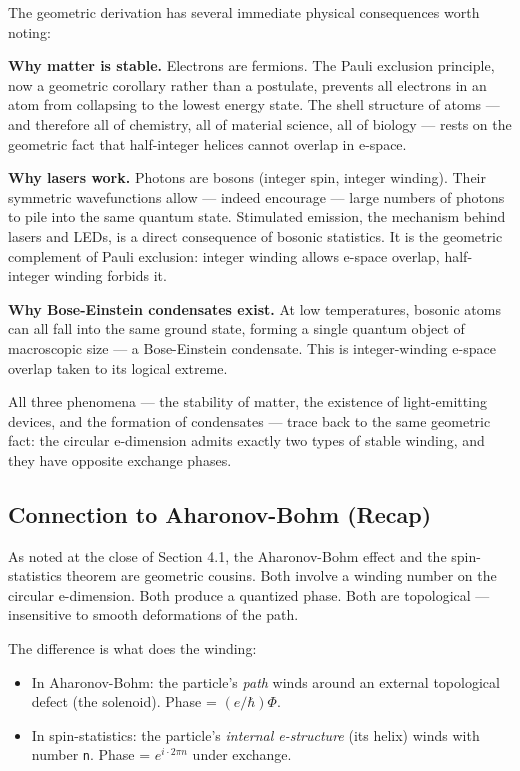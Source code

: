 \documentclass[aps,prd,preprint,superscriptaddress,longbibliography,floatfix]{revtex4-2}
\theoremstyle{remark}
\begin{document}
The geometric derivation has several immediate physical consequences worth noting:

\textbf{Why matter is stable.} Electrons are fermions. The Pauli exclusion principle, now a geometric corollary rather than a postulate, prevents all electrons in an atom from collapsing to the lowest energy state. The shell structure of atoms --- and therefore all of chemistry, all of material science, all of biology --- rests on the geometric fact that half-integer helices cannot overlap in e-space.

\textbf{Why lasers work.} Photons are bosons (integer spin, integer winding). Their symmetric wavefunctions allow --- indeed encourage --- large numbers of photons to pile into the same quantum state. Stimulated emission, the mechanism behind lasers and LEDs, is a direct consequence of bosonic statistics. It is the geometric complement of Pauli exclusion: integer winding allows e-space overlap, half-integer winding forbids it.

\textbf{Why Bose-Einstein condensates exist.} At low temperatures, bosonic atoms can all fall into the same ground state, forming a single quantum object of macroscopic size --- a Bose-Einstein condensate. This is integer-winding e-space overlap taken to its logical extreme.

All three phenomena --- the stability of matter, the existence of light-emitting devices, and the formation of condensates --- trace back to the same geometric fact: the circular e-dimension admits exactly two types of stable winding, and they have opposite exchange phases.



\subsection{Connection to Aharonov-Bohm (Recap)}

As noted at the close of Section 4.1, the Aharonov-Bohm effect and the spin-statistics theorem are geometric cousins. Both involve a winding number on the circular e-dimension. Both produce a quantized phase. Both are topological --- insensitive to smooth deformations of the path.

The difference is what does the winding:


\begin{itemize}
  \item In Aharonov-Bohm: the particle's \textit{path} winds around an external topological defect (the solenoid). Phase = $(e/\hbar)\Phi$.
  \item In spin-statistics: the particle's \textit{internal e-structure} (its helix) winds with number \texttt{n}. Phase = $e^{i\cdot2\pi n}$ under exchange.
\end{itemize}
\end{document}
